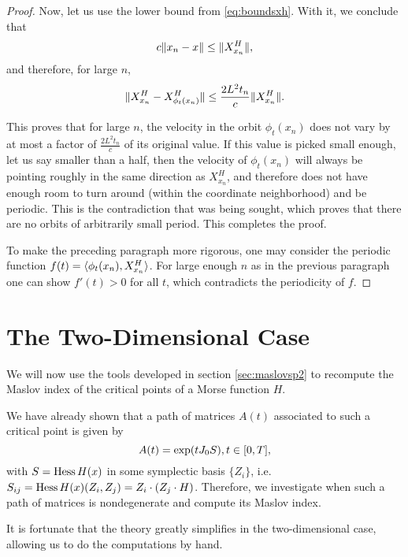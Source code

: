 \begin{proof}
Now, let us use the lower bound from \eqref{eq:boundsxh}. With it, we conclude that
\begin{equation}
c \lVert x_n - x\rVert \leq \lVert X^H_{x_n}\rVert,
\end{equation}
and therefore, for large $n$,
\begin{equation}
\lVert X^H_{x_n} - X^H_{\phi_t(x_n)}\rVert \leq \frac{2 L^2 t_n}c \lVert X^H_{x_n}\rVert.
\end{equation}

This proves that for large $n$, the velocity in the orbit $\phi_t(x_n)$ does not vary by at most a factor of $\frac{2 L^2 t_n}c$ of its original value. If this value is picked small enough, let us say smaller than a half, then the velocity of $\phi_t(x_n)$ will always be pointing roughly in the same direction as $X^H_{x_n}$, and therefore does not have enough room to turn around (within the coordinate neighborhood) and be periodic. This is the contradiction that was being sought, which proves that there are no orbits of arbitrarily small period. This completes the proof.

To make the preceding paragraph more rigorous, one may consider the periodic function $f(t) = \langle\phi_t(x_n), X^H_{x_n}\rangle$. For large enough $n$ as in the previous paragraph one can show $f'(t) > 0$ for all $t$, which contradicts the periodicity of $f$.
\end{proof}

\section{The Two-Dimensional Case}\label{sec:twodimensionalcase}

We will now use the tools developed in section \ref{sec:maslovsp2} to recompute the Maslov index of the critical points of a Morse function $H$.

We have already shown that a path of matrices $A(t)$ associated to such a critical point is given by
\begin{equation}
A(t) = \exp(t J_0 S), t \in \interval 0 T,
\end{equation}
with $S = \operatorname{Hess} H(x)$ in some symplectic basis $\{Z_i\}$, i.e. $S_{ij} = \operatorname{Hess} H(x)(Z_i, Z_j) = Z_i \cdot (Z_j \cdot H)$. Therefore, we investigate when such a path of matrices is nondegenerate and compute its Maslov index.

It is fortunate that the theory greatly simplifies in the two-dimensional case, allowing us to do the computations by hand.

